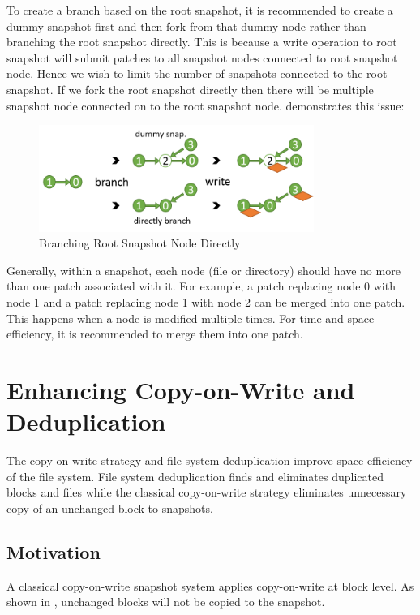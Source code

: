     To create a branch based on the root snapshot, it is recommended to create a dummy snapshot first and then fork from that dummy node rather than branching the root snapshot directly. This is because a write operation to root snapshot will submit patches to all snapshot nodes connected to root snapshot node. Hence we wish to limit the number of snapshots connected to the root snapshot. If we fork the root snapshot directly then there will be multiple snapshot node connected on to the root snapshot node.  demonstrates this issue:

\begin{figure}[hbtp]
\centering
\includegraphics[width=0.8\textwidth]{Chapter-4/figs/fig16.png}
\caption{Branching Root Snapshot Node Directly}
\label{fig:dummy_node}
\end{figure}

	Generally, within a snapshot, each node (file or directory) should have no more than one patch associated with it. For example, a patch replacing node 0 with node 1 and a patch replacing node 1 with node 2 can be merged into one patch. This happens when a node is modified multiple times. For time and space efficiency, it is recommended to merge them into one patch.
	
\section{Enhancing Copy-on-Write and Deduplication}

	The copy-on-write strategy and file system deduplication improve space efficiency of the file system. File system deduplication finds and eliminates duplicated blocks and files while the classical copy-on-write strategy eliminates unnecessary copy of an unchanged block to snapshots.

\subsection{Motivation}

    A classical copy-on-write snapshot system applies copy-on-write at block level. As shown in , unchanged blocks will not be copied to the snapshot.

